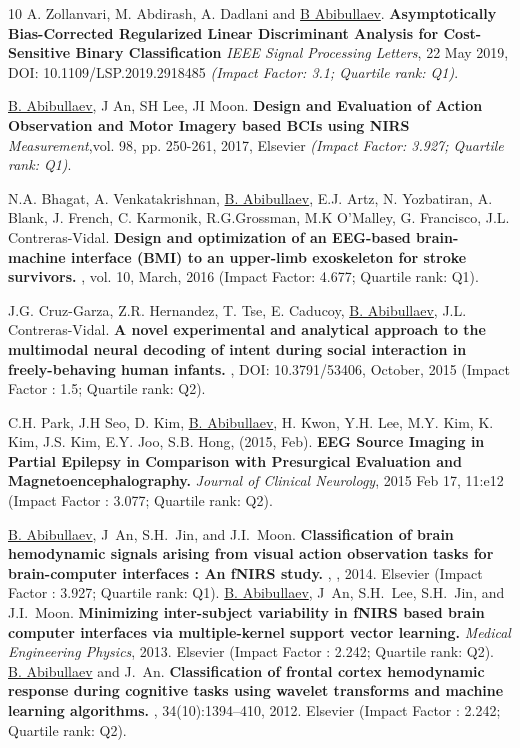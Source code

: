 \documentclass[10pt,letterpaper,sans]{moderncv}   %
\begin{document}
\begin{thebibliography}{10}
	\small 
	A. Zollanvari,  M. Abdirash, A. Dadlani and \underline{B Abibullaev}.
	\newblock \textbf{Asymptotically Bias-Corrected Regularized Linear Discriminant Analysis for Cost-Sensitive Binary Classification}
	\newblock \textit{IEEE Signal Processing Letters}, 22 May 2019,  DOI: 10.1109/LSP.2019.2918485 \textit{(Impact Factor: 3.1; Quartile rank: Q1)}.
	
	\small 
	\underline{B. Abibullaev}, J An, SH Lee, JI Moon.
	\newblock \textbf{Design and Evaluation of Action Observation and Motor Imagery based {BCIs} using {NIRS}} \newblock \textit{Measurement},vol. 98, pp. 250-261, 2017, Elsevier \textit{(Impact Factor: 3.927; Quartile rank: Q1)}.
	
	\small
	N.A. Bhagat, A. Venkatakrishnan, \underline{B. Abibullaev}, E.J. Artz, N. Yozbatiran, A. Blank, J. French, C. Karmonik, R.G.Grossman, M.K O'Malley, G. Francisco, J.L. Contreras-Vidal.
	\newblock \textbf{Design and optimization of an {EEG}-based brain-machine interface (BMI) to an upper-limb exoskeleton for stroke survivors.}
	, vol. 10, March, 2016 (Impact Factor: 4.677; Quartile rank: Q1).
	
	\small
	J.G. Cruz-Garza, Z.R. Hernandez, T. Tse, E. Caducoy, \underline{B. Abibullaev}, J.L. Contreras-Vidal.
	\newblock \textbf{A novel experimental and analytical approach to the multimodal neural decoding of intent during social interaction in freely-behaving human infants.}
	, DOI: 10.3791/53406, October, 2015 (Impact Factor : 1.5; Quartile rank: Q2).
	
	\small
	C.H. Park, J.H Seo, D. Kim, \underline{B. Abibullaev}, H. Kwon, Y.H. Lee, M.Y. Kim, K. Kim, J.S. Kim, E.Y. Joo, S.B. Hong, (2015, Feb). 
	\newblock \textbf{{EEG} Source Imaging in Partial Epilepsy in Comparison with Presurgical Evaluation and Magnetoencephalography.}
	{\em Journal of Clinical Neurology}, 2015 Feb 17, 11:e12 (Impact Factor : 3.077; Quartile rank: Q2).
	
	\underline{B. Abibullaev}, J~An, S.H.~Jin, and J.I.~Moon.
	\newblock \textbf{Classification of brain hemodynamic signals arising from
		visual action observation tasks for brain-computer interfaces : An {fNIRS} study. }, , 2014. Elsevier (Impact Factor : 3.927; Quartile rank: Q1).
	\underline{B. Abibullaev}, J~An, S.H.~Lee, S.H.~Jin, and J.I.~Moon.
	\newblock \textbf{Minimizing inter-subject variability in {fNIRS} based brain computer interfaces via multiple-kernel support vector learning.}
	 {\em Medical Engineering Physics}, 2013. Elsevier (Impact Factor : 2.242; Quartile rank: Q2).
	\underline{B. Abibullaev} and J.~An.
	\newblock \textbf{Classification of frontal cortex hemodynamic response during cognitive tasks using wavelet transforms and machine learning algorithms.}
	, 34(10):1394--410, 2012. Elsevier (Impact Factor : 2.242; Quartile rank: Q2).
	

\end{thebibliography}
\end{document}
